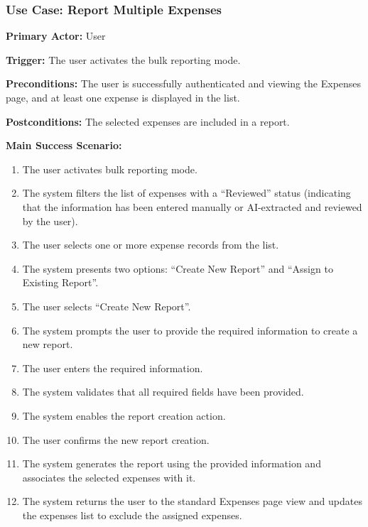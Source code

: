 \subsubsection{\textbf{Use Case: Report Multiple Expenses}}

\textbf{Primary Actor:} User

\textbf{Trigger:} The user activates the bulk reporting mode.

\textbf{Preconditions:} The user is successfully authenticated and viewing the Expenses page, and at least one expense is displayed in the list.

\textbf{Postconditions:} The selected expenses are included in a report.

\vspace{0.5cm}

\textbf{Main Success Scenario:}

\begin{enumerate} [leftmargin=0.75cm, noitemsep]
    \item The user activates bulk reporting mode.
    \item The system filters the list of expenses with a ``Reviewed'' status (indicating that the information has been entered manually or AI-extracted and reviewed by the user).
    \item The user selects one or more expense records from the list.
    \item The system presents two options: ``Create New Report'' and ``Assign to Existing Report''.
    \item The user selects ``Create New Report''.
    \item The system prompts the user to provide the required information to create a new report.
    \item The user enters the required information.
    \item The system validates that all required fields have been provided.
    \item The system enables the report creation action.
    \item The user confirms the new report creation.
    \item The system generates the report using the provided information and associates the selected expenses with it.
    \item The system returns the user to the standard Expenses page view and updates the expenses list to exclude the assigned expenses.
\end{enumerate}

